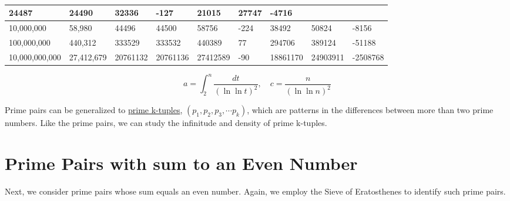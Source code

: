 \documentclass{aomart}
\begin{document}
\begin{table}[H]
\begin{adjustbox}{max width=\textwidth}
\begin{tabular}{|p{2.53cm}|p{1.9cm}|p{1.9cm}|p{1.67cm}|p{1.82cm}|p{1.48cm}|p{1.67cm}|p{1.93cm}|p{1.75cm}|}
24487 & 
24490 & 
32336 & 
\textcolor[HTML]{943734}{-127} & 
\textcolor[HTML]{808080}{21015} & 
\textcolor[HTML]{808080}{27747} & 
\textcolor[HTML]{808080}{-4716} \\ 
\hline
10,000,000 & 
\textcolor[HTML]{00B0F0}{58,980} & 
44496 & 
44500 & 
58756 & 
\textcolor[HTML]{943734}{-224} & 
\textcolor[HTML]{808080}{38492} & 
\textcolor[HTML]{808080}{50824} & 
\textcolor[HTML]{808080}{-8156} \\ 
\hline
100,000,000 & 
\textcolor[HTML]{00B0F0}{440,312} & 
333529 & 
333532 & 
440389 & 
\textcolor[HTML]{943734}{77} & 
\textcolor[HTML]{808080}{294706} & 
\textcolor[HTML]{808080}{389124} & 
\textcolor[HTML]{808080}{-51188} \\ 
\hline
10,000,000,000 & 
\textcolor[HTML]{00B0F0}{27,412,679} & 
20761132 & 
20761136 & 
27412589 & 
\textcolor[HTML]{943734}{-90} & 
\textcolor[HTML]{808080}{18861170} & 
\textcolor[HTML]{808080}{24903911} & 
\textcolor[HTML]{808080}{-2508768} \\ 
\hline
\end{tabular}
\end{adjustbox}
\caption{}
\end{table}


\vspace{1\baselineskip}


\begin{equation}
a =  \int_{2}^{n} \frac{dt}{(\ln \ln t)^{2}}, \quad c = \frac{n}{(\ln \ln n)^{2}}
\end{equation}



Prime pairs can be generalized to \href{https://en.wikipedia.org/wiki/Prime_k-tuple}{prime k-tuples}, \( (p_{1},p_{2},p_{3},\cdots  p_{k})\), which are patterns in the differences between more than two prime numbers.
Like the prime pairs, we can study the infinitude and density of prime k-tuples.


\vspace{2\baselineskip}


\section{Prime Pairs with sum to an Even Number}



Next, we consider prime pairs whose sum equals an even number. Again, we employ the Sieve of Eratosthenes to identify such prime pairs.
\end{document}
